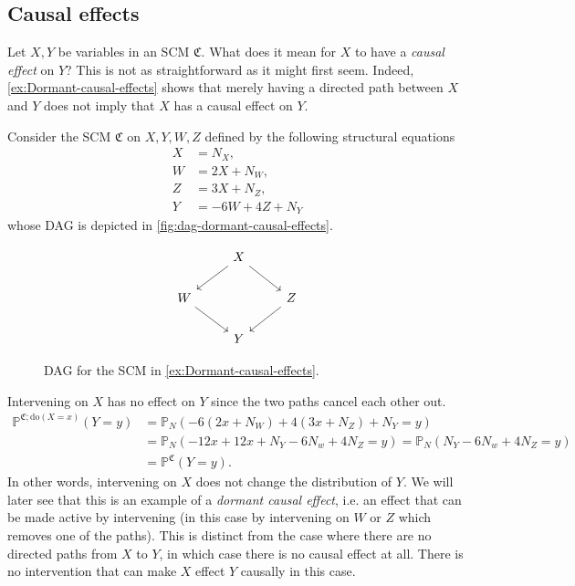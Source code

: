 \documentclass[../main.tex]{subfiles}
\begin{document}
    \subsection{Causal effects}
     Let ${X, Y}$ be variables in an SCM ${\mathfrak{C}}$. What does it mean for ${X}$ to have a \emph{causal effect} on ${Y}$? This is not as straightforward as it might first seem. Indeed, \autoref{ex:Dormant-causal-effects} shows that merely having a directed path between ${X}$ and ${Y}$ does not imply that ${X}$ has a causal effect on ${Y}$.
     \begin{ex}
     \label{ex:Dormant-causal-effects}
        Consider the SCM ${\mathfrak{C}}$ on ${X, Y, W, Z}$ defined by the following structural equations
        \begin{align*}
        X &= N_X,\\
        W &= 2X + N_W,\\
        Z &= 3X + N_Z,\\
        Y &= -6W + 4Z +N_Y
        \end{align*}
        whose DAG is depicted in \autoref{fig:dag-dormant-causal-effects}.
        \begin{figure}
            \[\begin{tikzcd}
                & X \\
                W && Z \\
                & Y
                \arrow[from=1-2, to=2-1]
                \arrow[from=1-2, to=2-3]
                \arrow[from=2-1, to=3-2]
                \arrow[from=2-3, to=3-2]
            \end{tikzcd}\]
            \caption{DAG for the SCM in \autoref{ex:Dormant-causal-effects}.}
            \label{fig:dag-dormant-causal-effects}
        \end{figure}
        Intervening on ${X}$ has no effect on ${Y}$ since the two paths cancel each other out. 
        \begin{align*}
            \mathbb{P}^{\mathfrak{C}; \text{do}(X=x)}(Y=y)&= \mathbb{P}_N(-6(2x+N_W)+4(3x+N_Z)+N_Y=y)\\
            &= \mathbb{P}_N( -12x + 12x + N_Y-6N_w+4N_Z=y)= \mathbb{P}_N(N_Y-6N_w+4N_Z=y)\\
            &= \mathbb{P}^{\mathfrak{C}}(Y=y).
        \end{align*}
        In other words, intervening on ${X}$ does not change the distribution of ${Y}$. We will later see that this is an example of a \emph{dormant causal effect}, i.e. an effect that can be made active by intervening (in this case by intervening on ${W}$ or ${Z}$ which removes one of the paths). This is distinct from the case where there are no directed paths from ${X}$ to ${Y}$, in which case there is no causal effect at all. There is no intervention that can make ${X}$ effect $Y$ causally in this case.
     \end{ex}
\end{document}
